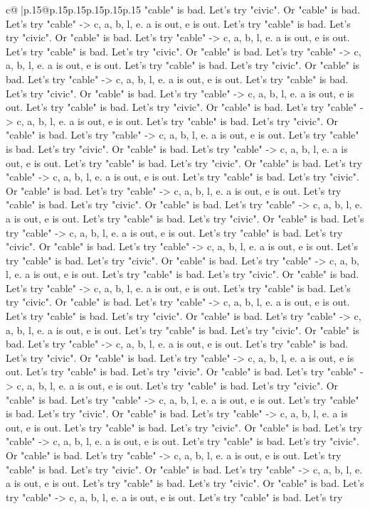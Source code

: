 \documentclass{article}
\begin{document}
{\begin{supertabular}{c@{$\;$}|p{.15\linewidth}@{}p{.15\linewidth}p{.15\linewidth}p{.15\linewidth}p{.15\linewidth}p{.15\linewidth}}
{{{"cable" is bad. Let's try "civic". Or "cable" is bad. Let's try "cable" {-}> c, a, b, l, e. a is out, e is out. Let's try "cable" is bad. Let's try "civic". Or "cable" is bad. Let's try "cable" {-}> c, a, b, l, e. a is out, e is out. Let's try "cable" is bad. Let's try "civic". Or "cable" is bad. Let's try "cable" {-}> c, a, b, l, e. a is out, e is out. Let's try "cable" is bad. Let's try "civic". Or "cable" is bad. Let's try "cable" {-}> c, a, b, l, e. a is out, e is out. Let's try "cable" is bad. Let's try "civic". Or "cable" is bad. Let's try "cable" {-}> c, a, b, l, e. a is out, e is out. Let's try "cable" is bad. Let's try "civic". Or "cable" is bad. Let's try "cable" {-}> c, a, b, l, e. a is out, e is out. Let's try "cable" is bad. Let's try "civic". Or "cable" is bad. Let's try "cable" {-}> c, a, b, l, e. a is out, e is out. Let's try "cable" is bad. Let's try "civic". Or "cable" is bad. Let's try "cable" {-}> c, a, b, l, e. a is out, e is out. Let's try "cable" is bad. Let's try "civic". Or "cable" is bad. Let's try "cable" {-}> c, a, b, l, e. a is out, e is out. Let's try "cable" is bad. Let's try "civic". Or "cable" is bad. Let's try "cable" {-}> c, a, b, l, e. a is out, e is out. Let's try "cable" is bad. Let's try "civic". Or "cable" is bad. Let's try "cable" {-}> c, a, b, l, e. a is out, e is out. Let's try "cable" is bad. Let's try "civic". Or "cable" is bad. Let's try "cable" {-}> c, a, b, l, e. a is out, e is out. Let's try "cable" is bad. Let's try "civic". Or "cable" is bad. Let's try "cable" {-}> c, a, b, l, e. a is out, e is out. Let's try "cable" is bad. Let's try "civic". Or "cable" is bad. Let's try "cable" {-}> c, a, b, l, e. a is out, e is out. Let's try "cable" is bad. Let's try "civic". Or "cable" is bad. Let's try "cable" {-}> c, a, b, l, e. a is out, e is out. Let's try "cable" is bad. Let's try "civic". Or "cable" is bad. Let's try "cable" {-}> c, a, b, l, e. a is out, e is out. Let's try "cable" is bad. Let's try "civic". Or "cable" is bad. Let's try "cable" {-}> c, a, b, l, e. a is out, e is out. Let's try "cable" is bad. Let's try "civic". Or "cable" is bad. Let's try "cable" {-}> c, a, b, l, e. a is out, e is out. Let's try "cable" is bad. Let's try "civic". Or "cable" is bad. Let's try "cable" {-}> c, a, b, l, e. a is out, e is out. Let's try "cable" is bad. Let's try "civic". Or "cable" is bad. Let's try "cable" {-}> c, a, b, l, e. a is out, e is out. Let's try "cable" is bad. Let's try "civic". Or "cable" is bad. Let's try "cable" {-}> c, a, b, l, e. a is out, e is out. Let's try "cable" is bad. Let's try "civic". Or "cable" is bad. Let's try "cable" {-}> c, a, b, l, e. a is out, e is out. Let's try "cable" is bad. Let's try "civic". Or "cable" is bad. Let's try "cable" {-}> c, a, b, l, e. a is out, e is out. Let's try "cable" is bad. Let's try "civic". Or "cable" is bad. Let's try "cable" {-}> c, a, b, l, e. a is out, e is out. Let's try "cable" is bad. Let's try "civic". Or "cable" is bad. Let's try "cable" {-}> c, a, b, l, e. a is out, e is out. Let's try "cable" is bad. Let's try "civic". Or "cable" is bad. Let's try "cable" {-}> c, a, b, l, e. a is out, e is out. Let's try "cable" is bad. Let's try }}}
\end{supertabular}}
\end{document}
